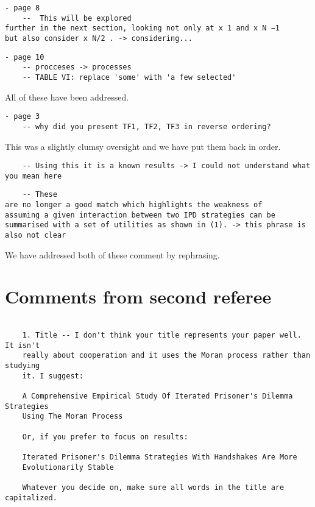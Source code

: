 \documentclass[a4]{article}
\begin{document}
\begin{verbatim}
- page 8
	--  This will be explored
further in the next section, looking not only at x 1 and x N −1
but also consider x N/2 . -> considering...
\end{verbatim}

\begin{verbatim}
- page 10
	-- procceses -> processes
	-- TABLE VI: replace 'some' with 'a few selected'
\end{verbatim}

All of these have been addressed. 

\begin{verbatim}
- page 3
	-- why did you present TF1, TF2, TF3 in reverse ordering?
\end{verbatim}

This was a slightly clumsy oversight and we have put them back in order.

\begin{verbatim}
	-- Using this it is a known results -> I could not understand what you mean here
\end{verbatim}

\begin{verbatim}
	-- These
are no longer a good match which highlights the weakness of
assuming a given interaction between two IPD strategies can be
summarised with a set of utilities as shown in (1). -> this phrase is also not clear
\end{verbatim}

We have addressed both of these comment by rephrasing.

\section{Comments from second referee}

\begin{verbatim}

    1. Title -- I don't think your title represents your paper well. It isn't
    really about cooperation and it uses the Moran process rather than studying
    it. I suggest: 

    A Comprehensive Empirical Study Of Iterated Prisoner's Dilemma Strategies
    Using The Moran Process

    Or, if you prefer to focus on results:

    Iterated Prisoner's Dilemma Strategies With Handshakes Are More
    Evolutionarily Stable

    Whatever you decide on, make sure all words in the title are capitalized.

\end{verbatim}
\end{document}

